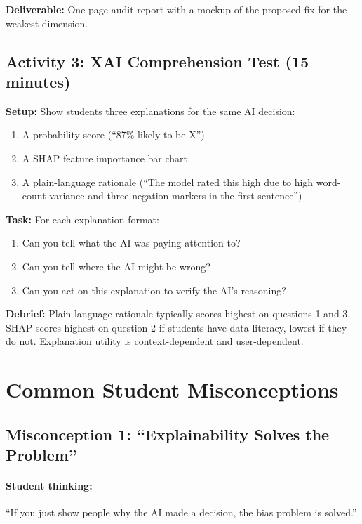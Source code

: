 \textbf{Deliverable:} One-page audit report with a mockup of the proposed fix for the weakest dimension.

\subsection{Activity 3: XAI Comprehension Test (15 minutes)}

\textbf{Setup:} Show students three explanations for the same AI decision:
\begin{enumerate}
    \item A probability score (``87\% likely to be X'')
    \item A SHAP feature importance bar chart
    \item A plain-language rationale (``The model rated this high due to high word-count variance and three negation markers in the first sentence'')
\end{enumerate}

\textbf{Task:} For each explanation format:
\begin{enumerate}
    \item Can you tell what the AI was paying attention to?
    \item Can you tell where the AI might be wrong?
    \item Can you act on this explanation to verify the AI's reasoning?
\end{enumerate}

\textbf{Debrief:} Plain-language rationale typically scores highest on questions 1 and 3. SHAP scores highest on question 2 if students have data literacy, lowest if they do not. Explanation utility is context-dependent and user-dependent.

\section{Common Student Misconceptions}

\subsection{Misconception 1: ``Explainability Solves the Problem''}

\paragraph{Student thinking:} ``If you just show people why the AI made a decision, the bias problem is solved.''

